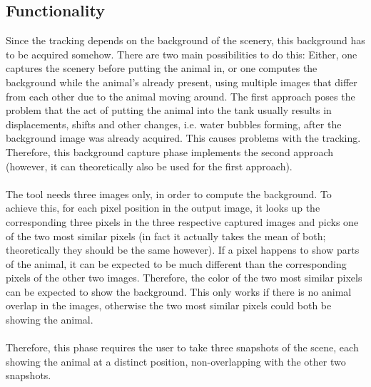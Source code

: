 \documentclass[12pt]{article}
\begin{document}
\subsection{Functionality}
Since the tracking depends on the background of the scenery, this background has to be acquired somehow. There are two main possibilities to do this: Either, one captures the scenery before putting the animal in, or one computes the background while the animal's already present, using multiple images that differ from each other due to the animal moving around. The first approach poses the problem that the act of putting the animal into the tank usually results in displacements, shifts and other changes, i.e. water bubbles forming, after the background image was already acquired. This causes problems with the tracking. Therefore, this background capture phase implements the second approach (however, it can theoretically also be used for the first approach).\\
\\
The tool needs three images only, in order to compute the background. To achieve this, for each pixel position in the output image, it looks up the corresponding three pixels in the three respective captured images and picks one of the two most similar pixels (in fact it actually takes the mean of both; theoretically they should be the same however). If a pixel happens to show parts of the animal, it can be expected to be much different than the corresponding pixels of the other two images. Therefore, the color of the two most similar pixels can be expected to show the background. This only works if there is no animal overlap in the images, otherwise the two most similar pixels could both be showing the animal.\\
\\
Therefore, this phase requires the user to take three snapshots of the scene, each showing the animal at a distinct position, non-overlapping with the other two snapshots.
\end{document}
